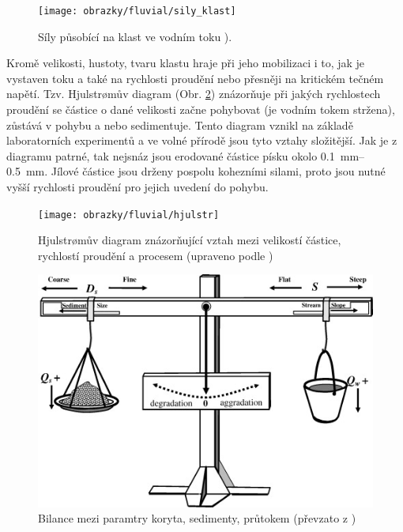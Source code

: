 \begin{figure}
	\centering
	\texttt{[image: obrazky/fluvial/sily\_klast]}
	\caption{Síly působící na klast ve vodním toku \textcite{summerfieldGlobalGeomorphologyIntroduction1999}).}
	\label{fig:sily_klast}
\end{figure}

Kromě velikosti, hustoty, tvaru klastu hraje při jeho mobilizaci i to, jak je vystaven toku a také na rychlosti proudění nebo přesněji na kritickém tečném napětí. Tzv. Hjulstr\o{}mův diagram (Obr. \ref{fig:hjulstr}) znázorňuje při jakých rychlostech proudění se částice o dané velikosti začne pohybovat (je vodním tokem stržena), zůstává v pohybu a nebo sedimentuje. Tento diagram vznikl na základě laboratorních experimentů a ve volné přírodě jsou tyto vztahy složitější. Jak je z diagramu patrné, tak nejsnáz jsou erodované částice písku okolo \SIrange{0,1}{0,5}{\milli\metre}. Jílové částice jsou drženy pospolu kohezními silami, proto jsou nutné vyšší rychlosti proudění pro jejich uvedení do pohybu. 

\begin{figure}
	\centering
	\texttt{[image: obrazky/fluvial/hjulstr]}
	\caption{Hjulstr\o{}mův diagram znázorňující vztah mezi velikostí částice, rychlostí proudění a procesem (upraveno podle \textcite{hjulstromStudiesMorphologicalActivity1935})}
	\label{fig:hjulstr}
\end{figure}

\begin{figure}
	\centering
	\includegraphics[width = 1\textwidth]{obrazky/fluvial/lanes_balance.jpg}
	\caption{Bilance mezi paramtry koryta, sedimenty, průtokem (převzato z \textcite{dustConceptualModelComplex2012})}
	\label{fig:vahy}
\end{figure}

